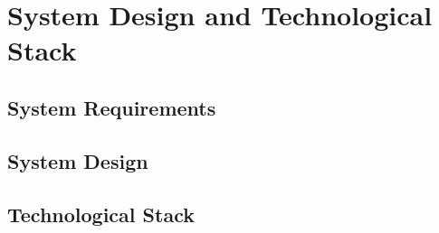 \section{System Design and Technological Stack}
\subsection{System Requirements}
\subsection{System Design}
\subsection{Technological Stack}